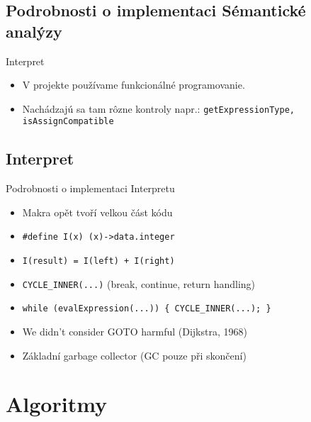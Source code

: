 \documentclass[13pt]{beamer}
\begin{document}
\subsection{Podrobnosti o implementaci Sémantické analýzy}

\begin{frame}{Interpret}
  \begin{itemize}
    \item V projekte používame funkcionálné programovanie.
    \item Nachádzajú sa tam rôzne kontroly napr.: \texttt{getExpressionType, isAssignCompatible}
  \end{itemize}
\end{frame}

\subsection{Interpret}

\begin{frame}{Podrobnosti o implementaci Interpretu}


  \begin{itemize}
    \item Makra opět tvoří velkou část kódu
    \item \texttt{\#define I(x) (x)->data.integer}
    \item \texttt{I(result) = I(left) + I(right)}
    \item \texttt{CYCLE\_INNER(...)} (break, continue, return handling)
    \item \texttt{while (evalExpression(...)) \{ CYCLE\_INNER(...); \}}
    \item We didn't consider GOTO harmful (Dijkstra, 1968)
    \item Základní garbage collector (GC pouze při skončení)
  \end{itemize}
\end{frame}

\section{Algoritmy}
\end{document}
